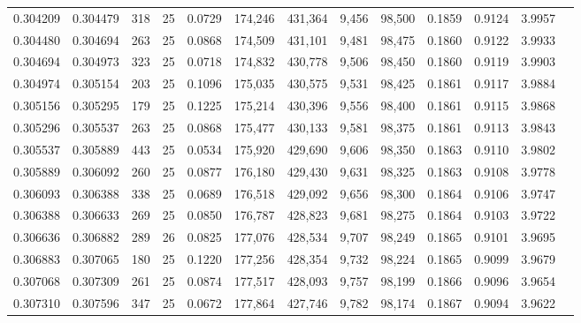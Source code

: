 \begin{tabular}{rrrrrrrrrrrrr}
0.304209 & 0.304479 &   318 &  25 &                                     0.0729 & 174,246 & 431,364 &   9,456 &  98,500 & 0.1859 & 0.9124 & 3.9957 \\
0.304480 & 0.304694 &   263 &  25 &                                     0.0868 & 174,509 & 431,101 &   9,481 &  98,475 & 0.1860 & 0.9122 & 3.9933 \\
0.304694 & 0.304973 &   323 &  25 &                                     0.0718 & 174,832 & 430,778 &   9,506 &  98,450 & 0.1860 & 0.9119 & 3.9903 \\
0.304974 & 0.305154 &   203 &  25 &                                     0.1096 & 175,035 & 430,575 &   9,531 &  98,425 & 0.1861 & 0.9117 & 3.9884 \\
0.305156 & 0.305295 &   179 &  25 &                                     0.1225 & 175,214 & 430,396 &   9,556 &  98,400 & 0.1861 & 0.9115 & 3.9868 \\
0.305296 & 0.305537 &   263 &  25 &                                     0.0868 & 175,477 & 430,133 &   9,581 &  98,375 & 0.1861 & 0.9113 & 3.9843 \\
0.305537 & 0.305889 &   443 &  25 &                                     0.0534 & 175,920 & 429,690 &   9,606 &  98,350 & 0.1863 & 0.9110 & 3.9802 \\
0.305889 & 0.306092 &   260 &  25 &                                     0.0877 & 176,180 & 429,430 &   9,631 &  98,325 & 0.1863 & 0.9108 & 3.9778 \\
0.306093 & 0.306388 &   338 &  25 &                                     0.0689 & 176,518 & 429,092 &   9,656 &  98,300 & 0.1864 & 0.9106 & 3.9747 \\
0.306388 & 0.306633 &   269 &  25 &                                     0.0850 & 176,787 & 428,823 &   9,681 &  98,275 & 0.1864 & 0.9103 & 3.9722 \\
0.306636 & 0.306882 &   289 &  26 &                                     0.0825 & 177,076 & 428,534 &   9,707 &  98,249 & 0.1865 & 0.9101 & 3.9695 \\
0.306883 & 0.307065 &   180 &  25 &                                     0.1220 & 177,256 & 428,354 &   9,732 &  98,224 & 0.1865 & 0.9099 & 3.9679 \\
0.307068 & 0.307309 &   261 &  25 &                                     0.0874 & 177,517 & 428,093 &   9,757 &  98,199 & 0.1866 & 0.9096 & 3.9654 \\
0.307310 & 0.307596 &   347 &  25 &                                     0.0672 & 177,864 & 427,746 &   9,782 &  98,174 & 0.1867 & 0.9094 & 3.9622 \\

\end{tabular}
